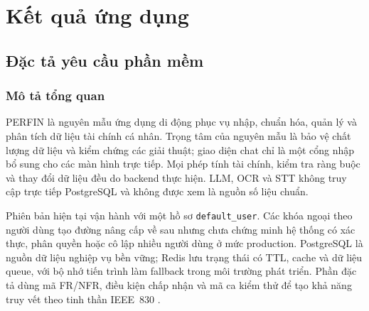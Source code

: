 \chapter{Kết quả ứng dụng}
\label{chap:results}

\section{Đặc tả yêu cầu phần mềm}

\subsection{Mô tả tổng quan}

PERFIN là nguyên mẫu ứng dụng di động phục vụ nhập, chuẩn hóa, quản lý và phân tích dữ liệu tài chính cá nhân. Trọng tâm của nguyên mẫu là bảo vệ chất lượng dữ liệu và kiểm chứng các giải thuật; giao diện chat chỉ là một cổng nhập bổ sung cho các màn hình trực tiếp. Mọi phép tính tài chính, kiểm tra ràng buộc và thay đổi dữ liệu đều do backend thực hiện. LLM, OCR và STT không truy cập trực tiếp PostgreSQL và không được xem là nguồn số liệu chuẩn.

Phiên bản hiện tại vận hành với một hồ sơ \texttt{default\_user}. Các khóa ngoại theo người dùng tạo đường nâng cấp về sau nhưng chưa chứng minh hệ thống có xác thực, phân quyền hoặc cô lập nhiều người dùng ở mức production. PostgreSQL là nguồn dữ liệu nghiệp vụ bền vững; Redis lưu trạng thái có TTL, cache và dữ liệu queue, với bộ nhớ tiến trình làm fallback trong môi trường phát triển. Phần đặc tả dùng mã FR/NFR, điều kiện chấp nhận và mã ca kiểm thử để tạo khả năng truy vết theo tinh thần IEEE~830 \cite{ieee830}.

